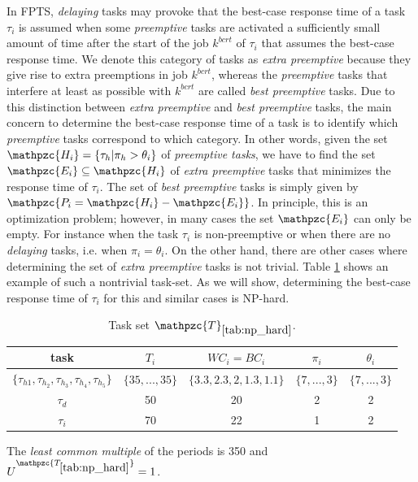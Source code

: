 \documentclass[fleqn]{article}
\begin{document}
In FPTS, \textit{delaying} tasks may provoke that the best-case response time of a task $\tau_i$ is assumed when some \textit{preemptive} tasks are activated a sufficiently small amount of time after the start of the job $k^{bcrt}$ of $\tau_i$ that assumes the best-case response time. We denote this category of tasks as \textit{extra preemptive} because they give rise to extra preemptions in job  $k^{bcrt}$, whereas the \textit{preemptive} tasks that interfere at least as possible with $k^{bcrt}$ are called \textit{best preemptive} tasks. Due to this distinction between \textit{extra preemptive} and \textit{best preemptive} tasks, the main concern to determine the best-case response time of a task is to identify which \textit{preemptive} tasks correspond to which category. In other words, given the set $ \mathpzc{H_i} = \{\tau_h | \pi_h > \theta_i\}$ of \textit{preemptive tasks}, we have to find the set $\mathpzc{E_i} \subseteq \mathpzc{H_i}$ of \textit{extra preemptive} tasks that minimizes the response time of $\tau_i$. The set of \textit{best preemptive} tasks is simply given by $\mathpzc{P_i =  \mathpzc{H_i} - \mathpzc{E_i}}$. In principle, this is an optimization problem; however, in many cases the set $\mathpzc{E_i}$ can only be empty. For instance when the task $\tau_i$ is non-preemptive or when there are no \textit{delaying} tasks, i.e. when $\pi_i = \theta_i$. On the other hand, there are other cases where determining the set of \textit{extra preemptive} tasks is not trivial. Table \ref{tab:np_hard} shows an example of such a nontrivial task-set. As we will show, determining the best-case response time of $\tau_i$ for this and similar cases is NP-hard.

\begin{table}[H]
	\center
	\caption{Task set $\mathpzc{T}_{\ref{tab:np_hard}}$.}
	\label{tab:np_hard}
	\begin{tabular}{c c c c c}
		\hline 
		task & $T_i$ & $WC_i=BC_i$ & $\pi_i$ & $\theta_i$ \\ 
		\hline 
		$\{ \tau_{h1},\tau_{h_2},\tau_{h_3},\tau_{h_4},\tau_{h_5} \}$& $\{35,...,35\}$  & $\{3.3,2.3,2,1.3,1.1\}$  & $\{7,...,3\}$ & $\{7,...,3\}$ \\ 
		$\tau_d$& 50 & 20 & 2 & 2 \\ 
		$\tau_i$& 70 & 22 & 1 & 2 \\
		\hline 
	\end{tabular}
	\small
	\item The \textit{least common multiple} of the periods is 350 and $U^{\mathpzc{T_{\ref{tab:np_hard}}}}=1$.
\end{table}
\end{document}
